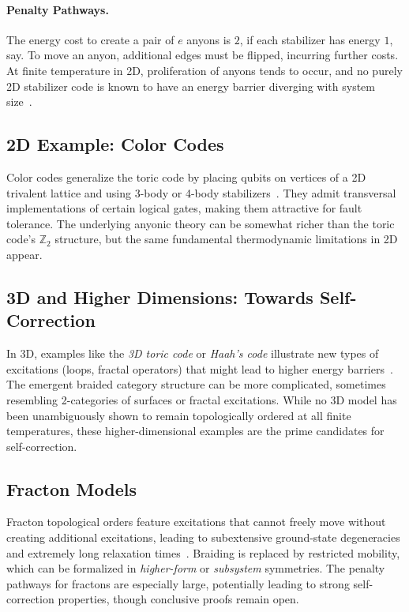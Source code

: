 \documentclass[12pt]{article}
\begin{document}
\paragraph{Penalty Pathways.} The energy cost to create a pair of $e$ anyons is $2$, if each stabilizer has energy $1$, say. To move an anyon, additional edges must be flipped, incurring further costs. At finite temperature in 2D, proliferation of anyons tends to occur, and no purely 2D stabilizer code is known to have an energy barrier diverging with system size~\cite{bravyi2009no}.

\subsection{2D Example: Color Codes}
Color codes generalize the toric code by placing qubits on vertices of a 2D trivalent lattice and using 3-body or 4-body stabilizers~\cite{bombin2006topological, bombin2015gauge}. They admit transversal implementations of certain logical gates, making them attractive for fault tolerance. The underlying anyonic theory can be somewhat richer than the toric code’s $\mathbb{Z}_2$ structure, but the same fundamental thermodynamic limitations in 2D appear.

\subsection{3D and Higher Dimensions: Towards Self-Correction}
In 3D, examples like the \emph{3D toric code} or \emph{Haah’s code} illustrate new types of excitations (loops, fractal operators) that might lead to higher energy barriers~\cite{haah2011local}. The emergent braided category structure can be more complicated, sometimes resembling 2-categories of surfaces or fractal excitations. While no 3D model has been unambiguously shown to remain topologically ordered at all finite temperatures, these higher-dimensional examples are the prime candidates for self-correction.

\subsection{Fracton Models}
Fracton topological orders feature excitations that cannot freely move without creating additional excitations, leading to subextensive ground-state degeneracies and extremely long relaxation times~\cite{vijay2016fracton}. Braiding is replaced by restricted mobility, which can be formalized in \emph{higher-form} or \emph{subsystem} symmetries. The penalty pathways for fractons are especially large, potentially leading to strong self-correction properties, though conclusive proofs remain open.
\end{document}
